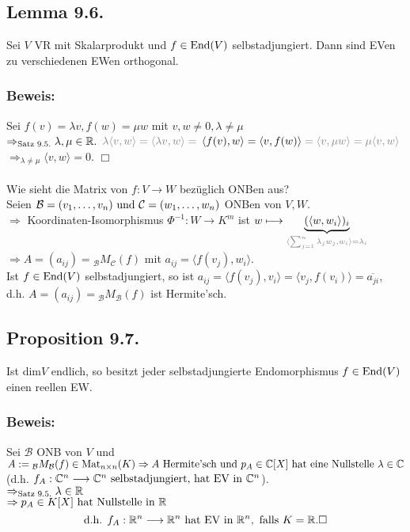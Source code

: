 \documentclass[a4paper, 12pt]{extarticle}
\newcommand{\skalar}[2] {
	\langle #1, #2\rangle
}
\newcommand{\tn}[1]{\textnormal {#1}}
\newcommand{\transp}[2][50]{\color{black!#1}#2}
\begin{document}
\subsection*{Lemma 9.6.}
Sei $V$ VR mit Skalarprodukt und $f \in \tn{End}(V)$ selbstadjungiert. Dann sind EVen zu verschiedenen EWen orthogonal.
\subsubsection*{Beweis:}
Sei $f(v)=\lambda v, f(w) = \mu w$ mit $v, w\neq 0, \lambda \neq \mu$\\
$\Rightarrow_{\tn{Satz 9.5.}} \lambda, \mu\in\mathbb{R}.$
$\transp{\lambda\skalar{v}{w} = \skalar{\lambda v}{w} = }$ $\skalar{f(v)}{w} = \skalar{v}{f(w)} \transp{= \skalar{v}{\mu w} = \mu \skalar{v}{w}}$\\
$\Rightarrow_{\lambda \neq \mu} \skalar{v}{w} = 0$. $\Box$\\\\
Wie sieht die Matrix von $f:V\longrightarrow W$ bezüglich ONBen aus?\\
Seien $\mathcal{B}=(v_1, \dots, v_n) \tn{ und } \mathcal{C} = (w_1, \dots, w_n)$ ONBen von $V, W$.\\
$\Rightarrow$ Koordinaten-Isomorphismus $\Phi^{-1}:W\longrightarrow K^m$ ist $w\longmapsto\underbrace{(\skalar{w}{w_i})_i}_{\transp{\skalar{\sum_{j=1}^{n}\lambda_jw_j}{w_i} = \lambda_i}}$\\
$\Rightarrow A = (a_{ij}) = {_{\mathcal{B}}}M_{\mathcal{C}}(f)$ mit $a_{ij}=\skalar{f(v_j)}{w_i}$.\\
Ist $f\in\tn{End}(V)$ selbstadjungiert, so ist $a_{ij} = \skalar{f(v_j)}{v_i} = \skalar{v_j}{f(v_i)} = \overline{a_{ji}}$,\\
d.h. $A = (a_{ij}) = {_\mathcal{B}}M_{\mathcal{B}}(f)$ ist Hermite'sch.
\subsection*{Proposition 9.7.}
Ist dim$V$ endlich, so besitzt jeder selbstadjungierte Endomorphismus $f\in\tn{End}(V)$ einen reellen EW.
\subsubsection*{Beweis:}
Sei $\mathcal{B}$ ONB von $V$ und $A:={_{\mathcal{B}}}M_{\mathcal{B}}(f)\in \tn{Mat}_{n \times n}(K)\\
\Rightarrow A \tn{ Hermite'sch und } p_A\in \mathbb{C}[X] \tn{ hat eine Nullstelle } \lambda \in \mathbb{C}$\\
(d.h. $f_A:\mathbb{C}^n\longrightarrow\mathbb{C}^n \tn{ selbstadjungiert, hat EV in } \mathbb{C}^n$).\\
$\Rightarrow_{\tn{Satz 9.5.}} \lambda \in \mathbb{R}$\\
$\Rightarrow p_A\in K[X] \tn{ hat Nullstelle in } \mathbb{R}$
$$\tn{d.h. } f_A:\mathbb{R}^n\longrightarrow\mathbb{R}^n \tn{ hat EV in } \mathbb{R}^n, \tn{ falls } K=\mathbb{R}. \Box$$
\end{document}
